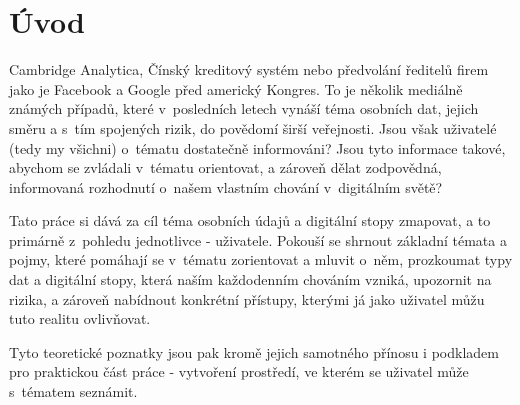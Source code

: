 \chapter*{Úvod}
\pagestyle{plain}

Cambridge Analytica, Čínský kreditový systém nebo předvolání ředitelů firem jako je Facebook a Google před americký Kongres. To je několik mediálně známých případů, které v~posledních letech vynáší téma osobních dat, jejich směru a s~tím spojených rizik, do povědomí širší veřejnosti.
Jsou však uživatelé (tedy my všichni) o~tématu dostatečně informováni? Jsou tyto informace takové, abychom se zvládali v~tématu orientovat, a zároveň dělat zodpovědná, informovaná rozhodnutí o~našem vlastním chování v~digitálním světě?

Tato práce si dává za cíl téma osobních údajů a digitální stopy zmapovat, a to primárně z~pohledu jednotlivce - uživatele. Pokouší se shrnout základní témata a pojmy, které pomáhají se v~tématu zorientovat a mluvit o~něm, prozkoumat typy dat a digitální stopy, která naším každodenním chováním vzniká, upozornit na rizika, a zároveň nabídnout konkrétní přístupy, kterými já jako uživatel můžu tuto realitu ovlivňovat.

Tyto teoretické poznatky jsou pak kromě jejich samotného přínosu i podkladem pro praktickou část práce - vytvoření prostředí, ve kterém se uživatel může s~tématem seznámit. 
